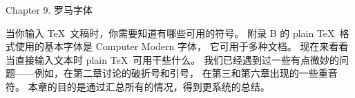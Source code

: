 


\beginchapter Chapter 9. 罗马字体


\1当你输入 \TeX\ 文稿时，你需要知道有哪些可用的符号。%
附录 B 的 plain \TeX\ 格式使用的基本字体是 Computer Modern 字体，
它可用于多种文档。%
现在来看看当直接输入文本时 plain \TeX\ 可用干些什么。%
我们已经遇到过一些有点微妙的问题——例如，在第二章讨论的破折号和引号，
在第三和第六章出现的一些重音符。%
本章的目的是通过汇总所有的情况，得到更系统的总结。

